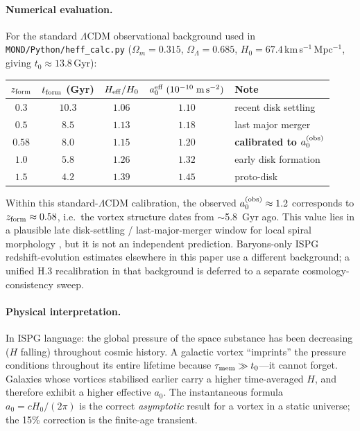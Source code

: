 \documentclass[11pt]{article}
\begin{document}
\paragraph{Numerical evaluation.}
For the standard $\Lambda$CDM observational background used in
\texttt{MOND/Python/heff\_calc.py} ($\Omega_m=0.315$,
$\Omega_\Lambda=0.685$, $H_0=67.4$\,km\,s$^{-1}$\,Mpc$^{-1}$,
giving $t_0\approx 13.8$\,Gyr):
\begin{center}
\begin{tabular}{@{}ccccl@{}}
\toprule
$z_{\rm form}$ & $t_{\rm form}$ (Gyr) & $H_{\rm eff}/H_0$
  & $a_0^{\rm eff}\;(10^{-10}\;\mathrm{m\,s^{-2}})$
  & Note \\
\midrule
$0.3$ & $10.3$ & $1.06$ & $1.10$ & recent disk settling \\
$0.5$ & $ 8.5$ & $1.13$ & $1.18$ & last major merger \\
$\mathbf{0.58}$ & $\mathbf{ 8.0}$ & $\mathbf{1.15}$
  & $\mathbf{1.20}$ & \textbf{calibrated to $a_0^{(\rm obs)}$} \\
$1.0$ & $ 5.8$ & $1.26$ & $1.32$ & early disk formation \\
$1.5$ & $ 4.2$ & $1.39$ & $1.45$ & proto-disk \\
\bottomrule
\end{tabular}
\end{center}
\noindent Within this standard-$\Lambda$CDM calibration, the observed
$a_0^{(\rm obs)}\approx 1.2$ corresponds to
$z_{\rm form}\approx 0.58$, i.e.\ the vortex structure dates from
$\sim$5.8~Gyr ago.  This value lies in a plausible late
disk-settling / last-major-merger window for local spiral morphology
\cite{Hopkins2010,Stewart2008}, but it is not an independent
prediction.  Baryons-only ISPG redshift-evolution estimates elsewhere
in this paper use a different background; a unified H.3 recalibration
in that background is deferred to a separate cosmology-consistency
sweep.

\paragraph{Physical interpretation.}
In ISPG language: the global pressure of the space substance has been decreasing ($H$ falling) throughout cosmic history.  A galactic vortex ``imprints'' the pressure conditions throughout its entire lifetime because $\tau_{\rm mem}\gg t_0$---it cannot forget.  Galaxies whose vortices stabilised earlier carry a higher time-averaged $H$, and therefore exhibit a higher effective $a_0$.  The instantaneous formula $a_0 = cH_0/(2\pi)$ is the correct \emph{asymptotic} result for a vortex in a static universe; the 15\% correction is the finite-age transient.
\end{document}
